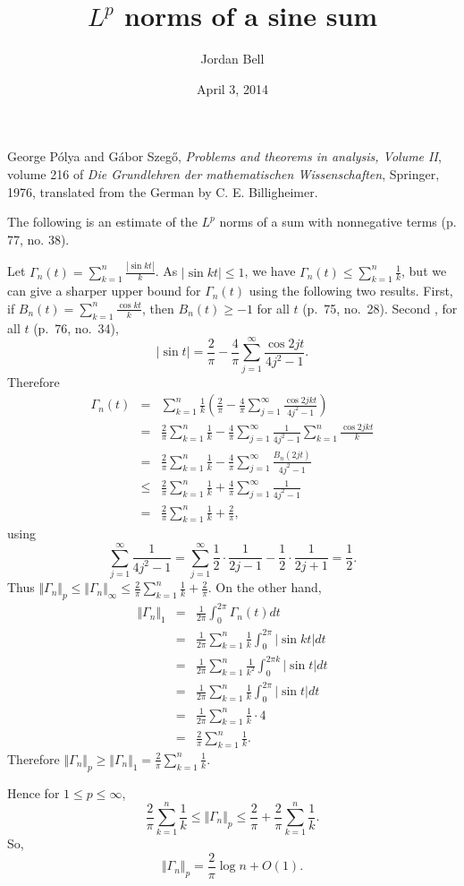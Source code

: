 \documentclass{article}
\newcommand{\norm}[1]{\Vert #1 \Vert}
\begin{document}
\title{$L^p$ norms of a sine sum}
\author{Jordan Bell}
\date{April 3, 2014}
\maketitle

George Pólya and Gábor Szegő, {\em Problems and theorems in analysis, Volume II}, volume 216 of {\em Die Grundlehren der mathematischen Wissenschaften}, Springer, 1976, translated from the German by C. E. Billigheimer.

The following is an estimate of the $L^p$ norms of a sum with nonnegative terms (p. 77, no. 38).

Let $\Gamma_n(t)=\sum_{k=1}^n \frac{|\sin kt|}{k}$. As $|\sin kt| \leq 1$, we have $\Gamma_n(t) \leq \sum_{k=1}^n \frac{1}{k}$, but we can
give a sharper upper bound for $\Gamma_n(t)$ using the following two results.
First, if $B_n(t)=\sum_{k=1}^n \frac{\cos kt}{k}$, then $B_n(t) \geq  -1$ for all $t$ (p.~75, no.~28).
Second , for all $t$ (p.~76, no.~34),
\[
|\sin t|=\frac{2}{\pi}-\frac{4}{\pi}\sum_{j=1}^\infty \frac{\cos 2jt}{4j^2-1}.
\]
Therefore
\begin{eqnarray*}
\Gamma_n(t)&=&\sum_{k=1}^n \frac{1}{k} \left( \frac{2}{\pi}-\frac{4}{\pi} \sum_{j=1}^\infty \frac{\cos 2jkt}{4j^2-1} \right)\\
&=&\frac{2}{\pi}\sum_{k=1}^n \frac{1}{k}-\frac{4}{\pi}\sum_{j=1}^\infty \frac{1}{4j^2-1} \sum_{k=1}^n \frac{\cos 2jkt}{k}\\
&=&\frac{2}{\pi}\sum_{k=1}^n \frac{1}{k}-\frac{4}{\pi}\sum_{j=1}^\infty \frac{B_n(2jt)}{4j^2-1}\\
&\leq&\frac{2}{\pi}\sum_{k=1}^n \frac{1}{k}+\frac{4}{\pi}\sum_{j=1}^\infty \frac{1}{4j^2-1}\\
&=&\frac{2}{\pi}\sum_{k=1}^n \frac{1}{k}+\frac{2}{\pi},
\end{eqnarray*}
using 
\[
\sum_{j=1}^\infty \frac{1}{4j^2-1}=
\sum_{j=1}^\infty \frac{1}{2}\cdot \frac{1}{2j-1}-\frac{1}{2}\cdot \frac{1}{2j+1} 
=
\frac{1}{2}.
\]
Thus $\norm{\Gamma_n}_p \leq \norm{\Gamma_n}_\infty \leq \frac{2}{\pi}\sum_{k=1}^n \frac{1}{k}+\frac{2}{\pi}$.
On the other hand, 
\begin{eqnarray*}
\norm{\Gamma_n}_1&=&\frac{1}{2\pi}\int_0^{2\pi} \Gamma_n(t) dt\\
&=&\frac{1}{2\pi} \sum_{k=1}^n \frac{1}{k} \int_0^{2\pi} |\sin kt| dt\\
&=&\frac{1}{2\pi} \sum_{k=1}^n \frac{1}{k^2} \int_0^{2\pi k} |\sin t| dt\\
&=&\frac{1}{2\pi} \sum_{k=1}^n \frac{1}{k} \int_0^{2\pi} |\sin t| dt\\
&=&\frac{1}{2\pi} \sum_{k=1}^n \frac{1}{k} \cdot 4\\
&=&\frac{2}{\pi}\sum_{k=1}^n \frac{1}{k}. 
\end{eqnarray*}
Therefore $\norm{\Gamma_n}_p \geq \norm{\Gamma_n}_1= \frac{2}{\pi}\sum_{k=1}^n \frac{1}{k}$.

Hence for $1 \leq p \leq \infty$,
\[
 \frac{2}{\pi}\sum_{k=1}^n \frac{1}{k} \leq \norm{\Gamma_n}_p \leq \frac{2}{\pi}+ \frac{2}{\pi}\sum_{k=1}^n \frac{1}{k}.
\]
So,
\[
\norm{\Gamma_n}_p = \frac{2}{\pi} \log n + O(1).
\]
\end{document}
